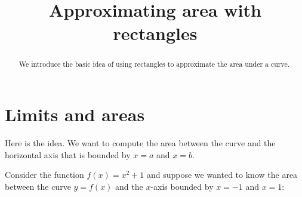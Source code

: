 \documentclass{ximera}
\title[Dig-In:]{Approximating area with rectangles}
\begin{document}
\begin{abstract}
  We introduce the basic idea of using rectangles to approximate the
  area under a curve.
\end{abstract}
\maketitle

\section{Limits and areas}

Here is the idea. We want to compute the area between the curve and
the horizontal axis that is bounded by $x=a$ and $x=b$.

Consider the function $f(x) = x^2 +1$ and suppose we wanted to know
the area between the curve $y=f(x)$ and the $x$-axis bounded by $x=-1$
and $x=1$:
\begin{image}
\end{image}
\end{document}
